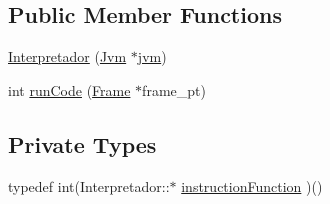 \subsection*{Public Member Functions}
\begin{DoxyCompactItemize}
\item 
\hyperlink{classInterpretador_a88354439afcfe11ce59c99041b9c4e3d}{Interpretador} (\hyperlink{classJvm}{Jvm} $\ast$\hyperlink{classInterpretador_aed3bd481ff345333414aa70360a94b7c}{jvm})
\item 
int \hyperlink{classInterpretador_a1bf25d40632df21fe829848201824595}{run\+Code} (\hyperlink{classFrame}{Frame} $\ast$frame\+\_\+pt)
\end{DoxyCompactItemize}
\subsection*{Private Types}
\begin{DoxyCompactItemize}
\item 
typedef int(Interpretador\+::$\ast$ \hyperlink{classInterpretador_a0c7f1073259b205ff698b95db287e713}{instruction\+Function} )()
\end{DoxyCompactItemize}

